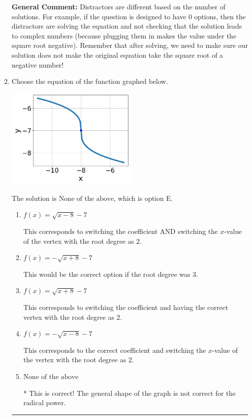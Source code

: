 \documentclass{extbook}[14pt]
\newcommand{\litem}[1]{\item #1

\rule{\textwidth}{0.4pt}}
\begin{document}
\begin{enumerate}
{\textbf{General Comment:} Distractors are different based on the number of solutions. For example, if the question is designed to have 0 options, then the distractors are solving the equation and not checking that the solution leads to complex numbers (because plugging them in makes the value under the square root negative). Remember that after solving, we need to make sure our solution does not make the original equation take the square root of a negative number!
}
\litem{
Choose the equation of the function graphed below.

\begin{center}
    \includegraphics[width=0.5\textwidth]{../Figures/radicalGraphToEquationCopyA.png}
\end{center}


The solution is \( \text{None of the above} \), which is option E.\begin{enumerate}[label=\Alph*.]
\item \( f(x) = \sqrt{x - 8} - 7 \)

This corresponds to switching the coefficient AND switching the $x$-value of the vertex with the root degree as $2$.
\item \( f(x) = - \sqrt{x + 8} - 7 \)

This would be the correct option if the root degree was $3$.
\item \( f(x) = \sqrt{x + 8} - 7 \)

This corresponds to switching the coefficient and having the correct vertex with the root degree as $2$.
\item \( f(x) = - \sqrt{x - 8} - 7 \)

This corresponds to the correct coefficient and switching the $x$-value of the vertex with the root degree as $2$.
\item \( \text{None of the above} \)

* This is correct! The general shape of the graph is not correct for the radical power.
\end{enumerate}

}
\end{enumerate}
\end{document}
